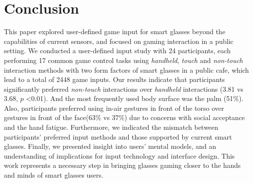\chapter{Conclusion}

This paper explored user-defined game input for smart glasses beyond the capabilities of current sensors, and focused on gaming interaction in a public setting. We conducted a user-defined input study with 24 participants, each performing 17 common game control tasks using \emph{handheld}, \emph{touch} and \emph{non-touch} interaction methods with two form factors of smart glasses in a public cafe, which lead to a total of 2448 game inputs. Our results indicate that participants significantly preferred \emph{non-touch} interactions over \emph{handheld} interactions (3.81 vs 3.68, $p$ \textless 0.01). And the most frequently used body surface was the palm (51\%). Also, participants preferred using in-air gestures in front of the torso over gestures in front of the face(63\% vs 37\%) due to concerns with social acceptance and the hand fatigue. Furthermore, we indicated the mismatch between participants' preferred input methods and those supported by current smart glasses. Finally, we presented insight into users' mental models, and an understanding of implications for input technology and interface design. This work represents a necessary step in bringing glasses gaming closer to the hands and minds of smart glasses users.